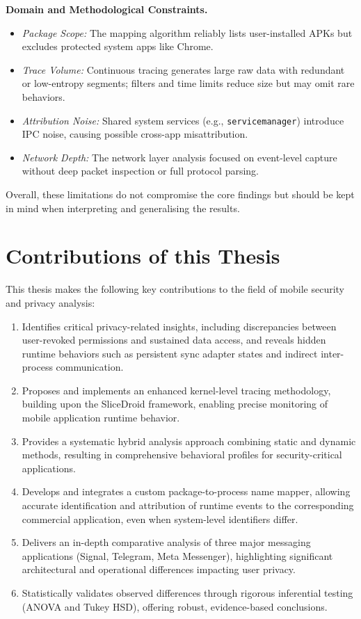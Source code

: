\documentclass[a4paper,12pt]{report}
\begin{document}
\textbf{Domain and Methodological Constraints.}
\begin{itemize}
\item \textit{Package Scope:} The mapping algorithm reliably lists user-installed APKs but excludes protected system apps like Chrome.

\item \textit{Trace Volume:} Continuous tracing generates large raw data with redundant or low-entropy segments; filters and time limits reduce size but may omit rare behaviors.
\item \textit{Attribution Noise:} Shared system services (e.g., \texttt{servicemanager}) introduce IPC noise, causing possible cross-app misattribution.
\item \textit{Network Depth:} The network layer analysis focused on event-level capture without deep packet inspection or full protocol parsing.
\end{itemize}

Overall, these limitations do not compromise the core findings but should be kept in mind when interpreting and generalising the results.
\section{Contributions of this Thesis}

This thesis makes the following key contributions to the field of mobile security and privacy analysis:

\begin{enumerate}[label=\roman*.]
    \item Identifies critical privacy-related insights, including discrepancies between user-revoked permissions and sustained data access, and reveals hidden runtime behaviors such as persistent sync adapter states and indirect inter-process communication.
    \item Proposes and implements an enhanced kernel-level tracing methodology, building upon the SliceDroid framework, enabling precise monitoring of mobile application runtime behavior.
    \item Provides a systematic hybrid analysis approach combining static and dynamic methods, resulting in comprehensive behavioral profiles for security-critical applications.
    \item Develops and integrates a custom package-to-process name mapper, allowing accurate identification and attribution of runtime events to the corresponding commercial application, even when system-level identifiers differ.
    \item Delivers an in-depth comparative analysis of three major messaging applications (Signal, Telegram, Meta Messenger), highlighting significant architectural and operational differences impacting user privacy.
    \item Statistically validates observed differences through rigorous inferential testing (ANOVA and Tukey HSD), offering robust, evidence-based conclusions.
\end{enumerate}
\end{document}
